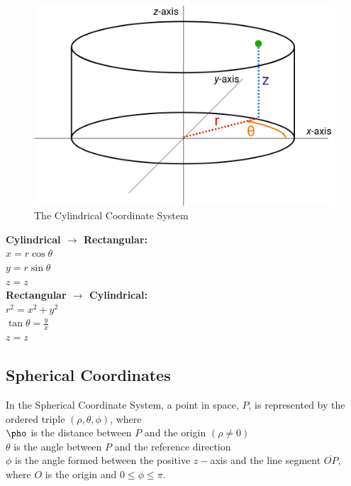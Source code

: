 \documentclass{article}
\begin{document}
            \begin{figure} [hbt!]
                \centering
                \includegraphics[scale=0.5]{Resources/Unit3Vectors/cylindrical.png}
                \caption*{The Cylindrical Coordinate System}
            \end{figure}

            \noindent \textbf{Cylindrical $\rightarrow$ Rectangular:} \\
            $   x=r\cos\theta$ \\
            $   y=r\sin\theta$ \\
            $   z=z$ \\
            \textbf{Rectangular $\rightarrow$ Cylindrical:} \\
            $   r^2=x^2+y^2$ \\
            $   \tan\theta=\frac{y}{x}$ \\
            $   z=z$ \\

        \pagebreak
        \subsection{Spherical Coordinates}

            In the Spherical Coordinate System, a point in space, $P$, is represented by the ordered
            triple $(\rho, \theta, \phi)$, where \\
            $   \pho $ is the distance between $P$ and the origin $(\rho\not=0)$ \\
            $   \theta $ is the angle between $P$ and the reference direction \\
            $   \phi $ is the angle formed between the positive $z-$axis and the line segment
            $\overline{OP}$, where $O$ is the origin and $0\leq\phi\leq\pi$.
\end{document}
